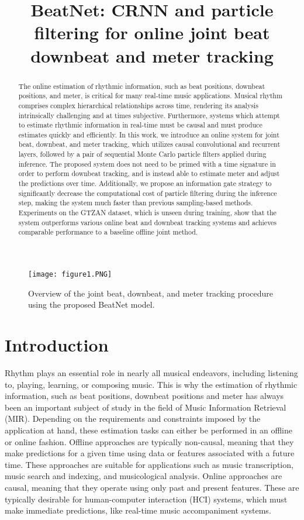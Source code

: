 \documentclass{article}
\title{BeatNet: CRNN and particle filtering for online joint beat downbeat and meter tracking}
\begin{document}
\maketitle
\begin{abstract}
The online estimation of rhythmic information, such as beat positions, downbeat positions, and meter, is critical for many real-time music applications. Musical rhythm comprises complex hierarchical relationships across time, rendering its analysis intrinsically challenging and at times subjective. Furthermore, systems which attempt to estimate rhythmic information in real-time must be causal and must produce estimates quickly and efficiently. In this work, we introduce an online system for joint beat, downbeat, and meter tracking, which utilizes causal convolutional and recurrent layers, followed by a pair of sequential Monte Carlo particle filters applied during inference. The proposed system does not need to be primed with a time signature in order to perform downbeat tracking, and is instead able to estimate meter and adjust the predictions over time. Additionally, we propose an information gate strategy to significantly decrease the computational cost of particle filtering during the inference step, making the system much faster than previous sampling-based methods. Experiments on the GTZAN dataset, which is unseen during training, show that the system outperforms various online beat and downbeat tracking systems and achieves comparable performance to a baseline offline joint method.
\end{abstract}
\begin{figure*}[htbp]
 \centerline{
 \texttt{[image: figure1.PNG]}}
 \caption{Overview of the joint beat, downbeat, and meter tracking procedure using the proposed BeatNet model.}
 \label{fig1}
\end{figure*}


\section{Introduction}\label{sec:introduction}
Rhythm plays an essential role in nearly all musical endeavors, including listening to, playing, learning, or composing music. This is why the estimation of rhythmic information, such as beat positions, downbeat positions and meter has always been an important subject of study in the field of Music Information Retrieval (MIR). Depending on the requirements and constraints imposed by the application at hand, these estimation tasks can either be performed in an offline or online fashion. Offline approaches are typically non-causal, meaning that they make predictions for a given time using data or features associated with a future time. These approaches are suitable for applications such as music transcription, music search and indexing, and musicological analysis. Online approaches are causal, meaning that they operate using only past and present features. These are typically desirable for human-computer interaction (HCI) systems, which must make immediate predictions, like real-time music accompaniment systems.
\end{document}
